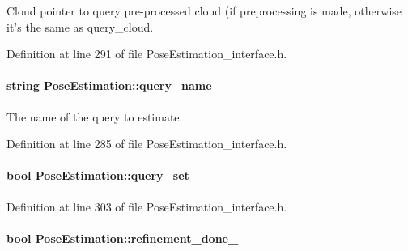 Cloud pointer to query pre-\/processed cloud (if preprocessing is made, otherwise it's the same as query\-\_\-cloud. 



Definition at line 291 of file Pose\-Estimation\-\_\-interface.\-h.

\hypertarget{classPoseEstimation_a5dd4cb5c1d202b2c1d5e874902dc31bf}{
\paragraph[{query\-\_\-name\-\_\-}]{\setlength{\rightskip}{0pt plus 5cm}string Pose\-Estimation\-::query\-\_\-name\-\_\-\hspace{0.3cm}{\ttfamily [private]}}}\label{classPoseEstimation_a5dd4cb5c1d202b2c1d5e874902dc31bf}


The name of the query to estimate. 



Definition at line 285 of file Pose\-Estimation\-\_\-interface.\-h.

\hypertarget{classPoseEstimation_a7e544a41181063a42466cab3bdaf7566}{
\paragraph[{query\-\_\-set\-\_\-}]{\setlength{\rightskip}{0pt plus 5cm}bool Pose\-Estimation\-::query\-\_\-set\-\_\-\hspace{0.3cm}{\ttfamily [private]}}}\label{classPoseEstimation_a7e544a41181063a42466cab3bdaf7566}


Definition at line 303 of file Pose\-Estimation\-\_\-interface.\-h.

\hypertarget{classPoseEstimation_a2a2d2fea36860191501e5b709df102cc}{
\paragraph[{refinement\-\_\-done\-\_\-}]{\setlength{\rightskip}{0pt plus 5cm}bool Pose\-Estimation\-::refinement\-\_\-done\-\_\-\hspace{0.3cm}{\ttfamily [private]}}}\label{classPoseEstimation_a2a2d2fea36860191501e5b709df102cc}



